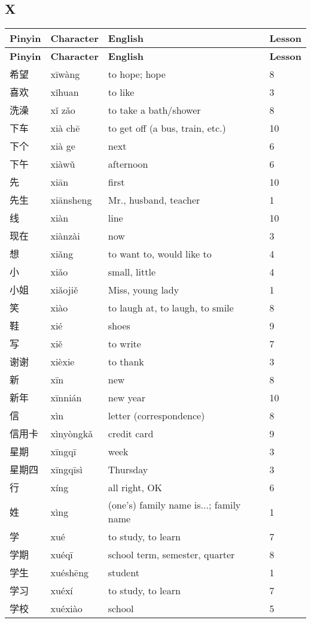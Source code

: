 \documentclass[12pt]{article}
\newcommand{\vocabitem}[4]{%
  #1 & #2 & #3 & #4 \\ \midrule
}
\begin{document}
\subsection*{X}
\begin{longtable}{P{\dimexpr\textwidth/4\relax}P{\dimexpr\textwidth/4\relax}P{\dimexpr\textwidth/4\relax}P{\dimexpr\textwidth/4\relax}}
\toprule
\textbf{Pinyin} & \textbf{Character} & \textbf{English} & \textbf{Lesson} \\
\midrule
\endfirsthead
\toprule
\textbf{Pinyin} & \textbf{Character} & \textbf{English} & \textbf{Lesson} \\
\midrule
\endhead
\vocabitem{希望}{xīwàng}{to hope; hope}{8}
\vocabitem{喜欢}{xǐhuan}{to like}{3}
\vocabitem{洗澡}{xǐ zǎo}{to take a bath/shower}{8}
\vocabitem{下车}{xià chē}{to get off (a bus, train, etc.)}{10}
\vocabitem{下个}{xià ge}{next}{6}
\vocabitem{下午}{xiàwǔ}{afternoon}{6}
\vocabitem{先}{xiān}{first}{10}
\vocabitem{先生}{xiānsheng}{Mr., husband, teacher}{1}
\vocabitem{线}{xiàn}{line}{10}
\vocabitem{现在}{xiànzài}{now}{3}
\vocabitem{想}{xiǎng}{to want to, would like to}{4}
\vocabitem{小}{xiǎo}{small, little}{4}
\vocabitem{小姐}{xiǎojiě}{Miss, young lady}{1}
\vocabitem{笑}{xiào}{to laugh at, to laugh, to smile}{8}
\vocabitem{鞋}{xié}{shoes}{9}
\vocabitem{写}{xiě}{to write}{7}
\vocabitem{谢谢}{xièxie}{to thank}{3}
\vocabitem{新}{xīn}{new}{8}
\vocabitem{新年}{xīnnián}{new year}{10}
\vocabitem{信}{xìn}{letter (correspondence)}{8}
\vocabitem{信用卡}{xìnyòngkǎ}{credit card}{9}
\vocabitem{星期}{xīngqī}{week}{3}
\vocabitem{星期四}{xīngqīsì}{Thursday}{3}
\vocabitem{行}{xíng}{all right, OK}{6}
\vocabitem{姓}{xìng}{(one’s) family name is...; family name}{1}
\vocabitem{学}{xué}{to study, to learn}{7}
\vocabitem{学期}{xuéqī}{school term, semester, quarter}{8}
\vocabitem{学生}{xuéshēng}{student}{1}
\vocabitem{学习}{xuéxí}{to study, to learn}{7}
\vocabitem{学校}{xuéxiào}{school}{5}
\end{longtable}
\end{document}
